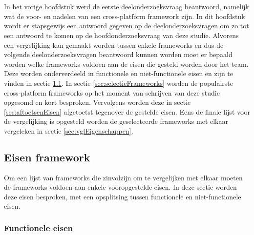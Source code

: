 
\chapter{}
\label{ch:methodologie}


In het vorige hoofdstuk werd de eerste deelonderzoeksvraag beantwoord, namelijk wat de voor- en nadelen van een cross-platform framework zijn. In dit hoofdstuk wordt er stapsgewijs een antwoord gegeven op de deelonderzoeksvragen om zo tot een antwoord te komen op de hoofdonderzoeksvraag van deze studie. Alvorens een vergelijking kan gemaakt worden tussen enkele frameworks en dus de volgende deelonderzoeksvragen beantwoord kunnen worden moet er bepaald worden welke frameworks voldoen aan de eisen die gesteld worden door het team. Deze worden onderverdeeld in functionele en niet-functionele eisen en zijn te vinden in sectie \ref{sec:eisen-framework}. In sectie \ref{sec:selectieFrameworks} worden de populairste cross-platform frameworks op het moment van schrijven van deze studie opgesomd en kort besproken. Vervolgens worden deze in sectie \ref{sec:aftoetsenEisen} afgetoetst tegenover de gestelde eisen. Eens de finale lijst voor de vergelijking is opgesteld worden de geselecteerde frameworks met elkaar vergeleken in sectie \ref{sec:vglEigenschappen}.

\section{Eisen framework}
\label{sec:eisen-framework}

Om een lijst van frameworks die zinvolzijn om te vergelijken met elkaar moeten de frameworks voldoen aan enkele vooropgestelde eisen. In deze sectie worden deze eisen besproken, met een opsplitsing tussen functionele en niet-functionele eisen.

\subsection{Functionele eisen}
\label{subsec:functioneleEisen}

